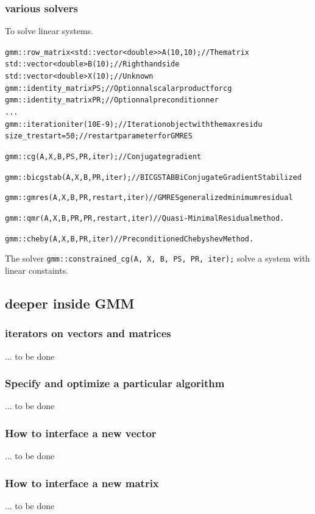 \documentclass[11pt,a4paper]{article}
\begin{document}
\subsubsection{various solvers}
To solve linear systems.
\begin{alltt}
  gmm::row_matrix< std::vector<double> > A(10, 10);  // The matrix
  std::vector<double> B(10); // Right hand side
  std::vector<double> X(10); // Unknown
  gmm::identity_matrix PS;   // Optionnal scalar product for cg
  gmm::identity_matrix PR;   // Optionnal preconditionner
  ...
  gmm::iteration iter(10E-9);// Iteration object with the max residu
  size_t restart = 50;       // restart parameter for GMRES
  
  gmm::cg(A, X, B, PS, PR, iter); // Conjugate gradient

  gmm::bicgstab(A, X, B, PR, iter); // BICGSTAB BiConjugate Gradient Stabilized

  gmm::gmres(A, X, B, PR, restart, iter) // GMRES generalized minimum residual

  gmm::qmr(A, X, B, PR, PR, restart, iter) // Quasi-Minimal Residual method.

  gmm::cheby(A, X, B, PR, iter) // Preconditioned Chebyshev Method.
\end{alltt}

The solver {\tt gmm::constrained_cg(A, X, B, PS, PR, iter);} solve a system with linear constaints.

\subsection{deeper inside GMM}

\subsubsection{iterators on vectors and matrices}
... to be done

\subsubsection{Specify and optimize a particular algorithm}
... to be done

\subsubsection{How to interface a new vector}
... to be done

\subsubsection{How to interface a new matrix}
... to be done
\end{document}
